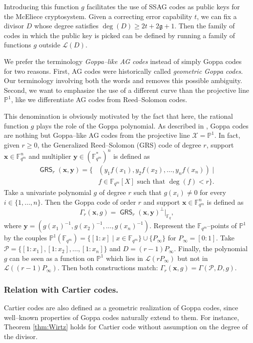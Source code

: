\documentclass[journal]{IEEEtran}
\theoremstyle{plain}
\theoremstyle{definition}
\theoremstyle{remark}
\newcommand{\calP}{\mathcal{P}}
\newcommand{\calL}{\mathcal{L}}
\newcommand{\calX}{\mathcal{X}}
\newcommand{\fqm}{\mathbb{F}_{q^m}}
\newcommand{\fq}{\mathbb{F}_{q}}
\newcommand{\PP}{\mathbb{P}}
\newcommand{\GRS}{\operatorname{\mathsf{GRS}}}
\begin{document}
	
	Introducing this function $g$ facilitates the use of SSAG codes as public keys for the McEliece cryptosystem. Given a correcting error capability $t$, we can fix a divisor $D$ whose degree satisfies $\deg (D) \geq 2t + 2\mathfrak{g}+1$. Then the family of codes in which the public key is picked can be defined by running a family of functions $g$ outside $\calL(D)$.
	
	
	\medskip
	
	We prefer the terminology \emph{Goppa--like AG codes} instead of simply Goppa codes for two reasons. First, AG codes were historically called \textit{geometric Goppa codes}. Our terminology involving both the words  and  removes this possible ambiguity. Second, we want to emphasize the use of a different curve than the projective line $\PP^1$, like we differentiate AG codes from Reed--Solomon codes.
	
	This denomination is obviously motivated by the fact that here, the rational function $g$ plays the role of the Goppa polynomial. As described in \cite[Example~9.1.8]{Sti09}, Goppa codes are nothing but Goppa--like AG codes from the projective line $\calX=\PP^1$. In fact, given $r \geq 0$, the Generalized Reed--Solomon (GRS) code of degree $r$, support $\mathbf{x} \in \fqm^n$ and multiplier $\mathbf{y} \in (\fqm^*)^n$ is defined as
	\[\begin{aligned}
	\GRS_r(\mathbf{x},\mathbf{y})=\{&(y_1f(x_1),y_2f(x_2),\dots,y_nf(x_n)) \mid\\& f \in \fqm[X] \text{ such that } \deg (f) < r \}.
	\end{aligned}\]
	Take a univariate polynomial $g$ of degree $r$ such that $g(x_i) \neq 0$ for every  $i \in \{1,\dots,n\}$. Then the Goppa code of order $r$ and support $\mathbf{x} \in \fqm^n$ is defined as
	\begin{equation}\label{eq:classical_Goppa}
		\Gamma_r(\mathbf{x},g)= \GRS_r(\mathbf{x},\mathbf{y})^\perp|_{\fq},
	\end{equation}
	where $\mathbf{y}=(g(x_1)^{-1},g(x_2)^{-1},\dots,g(x_n)^{-1})$.
	Represent the $\fqm$--points of $\PP^1$ by the couples $\PP^1(\fqm)=\{[1:x] \mid x \in \fqm\} \cup \{P_\infty\}$ for $P_\infty=[0:1]$. Take $\calP=\{[1:x_1],[1:x_2],\dots,[1:x_n]\}$ and $D=(r-1)P_\infty$. Finally, the polynomial $g$ can be seen as a function on $\PP^1$ which lies in $\calL(rP_\infty)$ but not in $\calL((r-1)P_\infty)$. Then both constructions match: $\Gamma_r(\mathbf{x},g)=\Gamma(\calP,D,g)$.
	
	\subsubsection{Relation with Cartier codes.} Cartier codes \cite{Cou14} are also defined as a geometric realization of Goppa codes, since well--known properties of Goppa codes naturally extend to them. For instance, Theorem \ref{thm:Wirtz} holds for Cartier code without assumption on the degree of the divisor.
	
\end{document}

